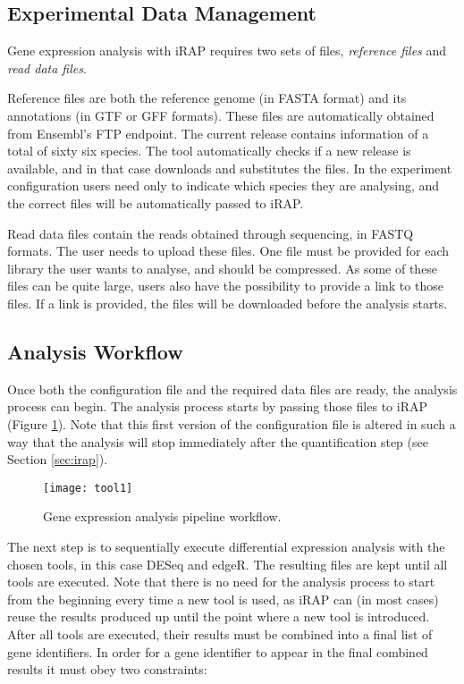 \subsection{Experimental Data Management}

Gene expression analysis with iRAP requires two sets of files, \emph{reference
files} and \emph{read data files}.

Reference files are both the reference genome (in FASTA format) and its
annotations (in GTF or GFF formats). These files are automatically obtained from
Ensembl's FTP endpoint. The current release contains information of a total of
sixty six species. The tool automatically checks if a new release is available,
and in that case downloads and substitutes the files. In the experiment
configuration users need only to indicate which species they are analysing, and
the correct files will be automatically passed to iRAP.

Read data files contain the reads obtained through sequencing, in FASTQ formats.
The user needs to upload these files. One file must be provided for each library
the user wants to analyse, and should be compressed. As some of these files can
be quite large, users also have the possibility to provide a link to those
files. If a link is provided, the files will be downloaded before the analysis
starts.

\subsection{Analysis Workflow}

Once both the configuration file and the required data files are ready, the
analysis process can begin. The analysis process starts by passing those files
to iRAP (Figure \ref{fig:tool1}). Note that this first version of the
configuration file is altered in such a way that the analysis will stop
immediately after the quantification step (see Section \ref{sec:irap}).

\begin{figure}[!htb]
  \begin{center}
    \leavevmode
    \texttt{[image: tool1]}
    \caption[Gene expression analysis pipeline workflow]{
      Gene expression analysis pipeline workflow.
    }
    \label{fig:tool1}
  \end{center}
\end{figure}

The next step is to sequentially execute differential expression analysis with
the chosen tools, in this case DESeq and edgeR. The resulting files are kept
until all tools are executed. Note that there is no need for the analysis
process to start from the beginning every time a new tool is used, as iRAP can
(in most cases) reuse the results produced up until the point where a new tool
is introduced. After all tools are executed, their results must be combined into
a final list of gene identifiers. In order for a gene identifier to appear in
the final combined results it must obey two constraints:

